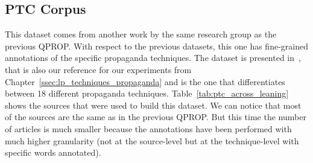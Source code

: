 \subsection{PTC Corpus}
This dataset comes from another work by the same research group as the previous QPROP.
With respect to the previous datasets, this one has fine-grained annotations of the specific propaganda techniques. The dataset is presented in~\citet{da2019fine}, that is also our reference for our experiments from Chapter~\ref{ssec:lp_techniques_propaganda} and is the one that differentiates between 18 different propaganda techniques.
Table~\ref{tab:ptc_across_leaning} shows the sources that were used to build this dataset. We can notice that most of the sources are the same as in the previous QPROP. But this time the number of articles is much smaller because the annotations have been performed with much higher granularity (not at the source-level but at the technique-level with specific words annotated).

